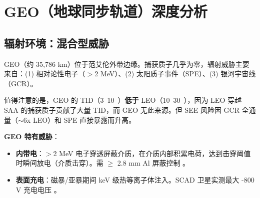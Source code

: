 
\section{GEO（地球同步轨道）深度分析}

\subsection{辐射环境：混合型威胁}

GEO（约 35,786 km）位于范艾伦外带边缘。捕获质子几乎为零，辐射威胁主要来自：(1) 相对论性电子（$>$2 MeV）、(2) 太阳质子事件（SPE）、(3) 银河宇宙线（GCR）。

\begin{table}[H]
\centering
\caption{GEO 辐射环境关键参数}
\label{tab:geo-rad}
\end{table}

值得注意的是，GEO 的 TID（3--10~\kradyr）\textbf{低于} LEO（10--30~\kradyr），因为 LEO 穿越 SAA 的捕获质子贡献了大量 TID，而 GEO 无此来源。但 SEE 风险因 GCR 全通量（$\sim$6x LEO）和 SPE 直接暴露而升高。

\textbf{GEO 特有威胁}：
\begin{itemize}
    \item \textbf{内带电}：$>$2 MeV 电子穿透屏蔽介质，在介质内部积累电荷，达到击穿阈值时瞬间放电（介质击穿）。需 $\geq$ 2.8 mm Al 屏蔽控制 \cite{horne_internal_charging_2025}。
    \item \textbf{表面充电}：磁暴/亚暴期间 keV 级热等离子体注入。SCAD 卫星实测最大 -800 V 充电电压 \cite{zheng_scad_2023}。
\end{itemize}

